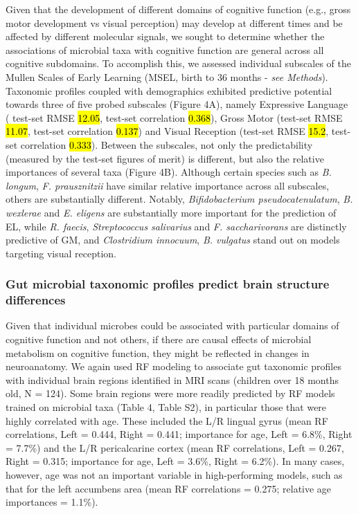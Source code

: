 \documentclass{article}
\begin{document}
Given that the development of different domains of cognitive function
(e.g., gross motor development vs visual perception) may develop at different times
and be affected by different molecular signals,
we sought to determine whether the associations of microbial taxa
with cognitive function are general across all cognitive subdomains.
To accomplish this, we assessed individual subscales of the  
Mullen Scales of Early Learning (MSEL, birth to 36 months - \textit{see Methods}). 
Taxonomic profiles coupled with demographics exhibited predictive potential towards three
of five probed subscales (Figure 4A), 
namely Expressive Language ( test-set RMSE \hl{12.05}, test-set correlation \hl{0.368}), 
Gross Motor (test-set RMSE \hl{11.07}, test-set correlation \hl{0.137}) and 
Visual Reception (test-set RMSE \hl{15.2}, test-set correlation \hl{0.333}).
Between the subscales, not only the predictability (measured by the test-set figures of merit) is different,
but also the relative importances of several taxa (Figure 4B).
Although certain species such as \textit{B. longum}, \textit{F. prausznitzii} 
have similar relative importance across all subscales, others are substantially different.
Notably, \textit{Bifidobacterium pseudocatenulatum}, \textit{B. wexlerae} and \textit{E. eligens} are
substantially more important for the prediction of EL, while
\textit{R. faecis}, \textit{Streptococcus salivarius} and \textit{F. saccharivorans} are
distinctly predictive of GM, and
\textit{Clostridium innocuum}, \textit{B. vulgatus} 
stand out on models targeting visual reception.

\subsubsection*{Gut microbial taxonomic profiles predict brain structure differences}

Given that individual microbes could be associated with particular domains
of cognitive function and not others, if there are causal effects of microbial metabolism on cognitive
function, they might be reflected in changes in neuroanatomy. We again
used RF modeling to associate gut taxonomic
profiles with individual brain regions identified in MRI scans
(children over 18 months old, N = 124).
Some brain regions were more readily
predicted by RF models trained on microbial taxa (Table 4, Table S2), in particular those that were highly correlated with age.
These included the L/R lingual gyrus (mean RF correlations, Left =
0.444, Right = 0.441; importance for age, Left = 6.8\%, Right =
7.7\%) and the L/R pericalcarine cortex (mean RF correlations, Left =
0.267, Right = 0.315; importance for age, Left = 3.6\%, Right = 6.2\%).
In many cases, however, age was not an important variable in
high-performing models, such as that for the left accumbens area (mean
RF correlations = 0.275; relative age importances = 1.1\%).
\end{document}
